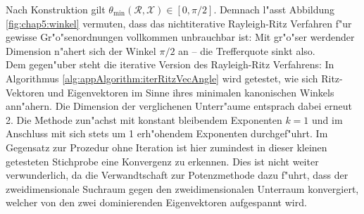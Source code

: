 Nach Konstruktion gilt $\theta_{\min}(\mathcal{R},\mathcal{X})\in[0,\pi/2]$.
Demnach l"asst Abbildung \ref{fig:chap5:winkel} vermuten, dass das nichtiterative Rayleigh-Ritz Verfahren f"ur gewisse Gr"o"senordnungen vollkommen unbrauchbar ist: Mit gr"o"ser werdender Dimension n"ahert sich der Winkel $\pi/2$ an -- die Trefferquote sinkt also.\\

Dem gegen"uber steht die iterative Version des Rayleigh-Ritz Verfahrens: In Algorithmus \ref{alg:appAlgorithm:iterRitzVecAngle} wird getestet, wie sich Ritz-Vektoren und Eigenvektoren im Sinne ihres minimalen kanonischen Winkels ann"ahern. Die Dimension der verglichenen Unterr"aume entsprach dabei erneut 2.
Die Methode zun"achst mit konstant bleibendem Exponenten $k=1$ und im Anschluss mit sich stets um 1 erh"ohendem Exponenten durchgef"uhrt. Im Gegensatz zur Prozedur ohne Iteration ist hier zumindest in dieser kleinen getesteten Stichprobe eine Konvergenz zu erkennen. Dies ist nicht weiter verwunderlich, da die Verwandtschaft zur Potenzmethode dazu f"uhrt, dass der zweidimensionale Suchraum gegen den zweidimensionalen Unterraum konvergiert, welcher von den zwei dominierenden Eigenvektoren aufgespannt wird.


